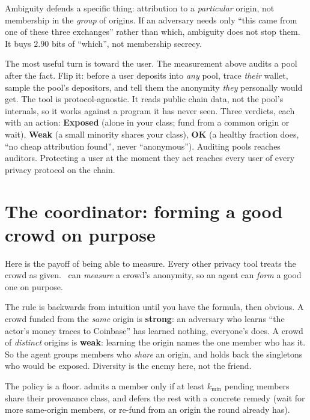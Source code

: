 \documentclass[11pt]{article}
\begin{document}
\begin{honest}
Ambiguity defends a specific thing: attribution to a \emph{particular} origin, not
membership in the \emph{group} of origins. If an adversary needs only ``this came from
one of these three exchanges'' rather than which, ambiguity does not stop them. It buys
$2.90$ bits of ``which'', not membership secrecy.
\end{honest}

The most useful turn is toward the user. The measurement above audits a pool after the
fact. Flip it: before a user deposits into \emph{any} pool, trace \emph{their} wallet,
sample the pool's depositors, and tell them the anonymity \emph{they} personally would
get. The tool is protocol-agnostic. It reads public chain data, not the pool's
internals, so it works against a program it has never seen. Three verdicts, each with an
action: \textbf{Exposed} (alone in your class; fund from a common origin or wait),
\textbf{Weak} (a small minority shares your class), \textbf{OK} (a healthy fraction does,
``no cheap attribution found'', never ``anonymous''). Auditing pools reaches auditors.
Protecting a user at the moment they act reaches every user of every privacy protocol on
the chain.

\section{The coordinator: forming a good crowd on purpose}
\label{sec:coord}

Here is the payoff of being able to measure. Every other privacy tool treats the crowd
as given. \river\ can \emph{measure} a crowd's anonymity, so an agent can \emph{form} a
good one on purpose.

\begin{intuition}
The rule is backwards from intuition until you have the formula, then obvious. A crowd
funded from the \emph{same} origin is \textbf{strong}: an adversary who learns ``the
actor's money traces to Coinbase'' has learned nothing, everyone's does. A crowd of
\emph{distinct} origins is \textbf{weak}: learning the origin names the one member who
has it. So the agent groups members who \emph{share} an origin, and holds back the
singletons who would be exposed. Diversity is the enemy here, not the friend.
\end{intuition}

The policy is a floor.  admits a member only if at
least $k_{\min}$ pending members share their provenance class, and defers the rest with a
concrete remedy (wait for more same-origin members, or re-fund from an origin the round
already has).
\end{document}
